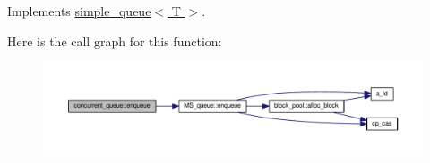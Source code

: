 Implements \hyperlink{classsimple__queue_a189cc4bc19b3a8c84fba3bdea89c75c1}{simple\-\_\-queue$<$ T $>$}.



Here is the call graph for this function\-:
\nopagebreak
\begin{figure}[H]
\begin{center}
\leavevmode
\includegraphics[width=350pt]{classconcurrent__queue_a8c549b70d8e6f899b9b55c6f8eacce22_cgraph}
\end{center}
\end{figure}



